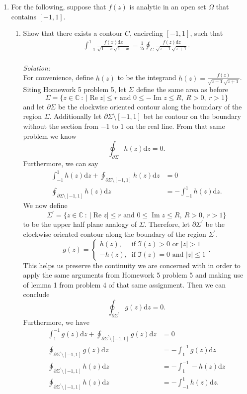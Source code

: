 \documentclass[10pt]{amsart}
\newcommand{\D}{\mathrm{d}}
\newcommand{\I}{\mathrm{i}}
\DeclareMathOperator{\real}{Re}
\DeclareMathOperator{\imag}{Im}
\theoremstyle{nonumberplain}
\begin{document}
\begin{enumerate}[label={\bf {\arabic*}:}]
\newpage

\item For the following, suppose that $f(z)$ is analytic in an open
  set $\Omega$ that contains $[-1,1]$.  
\begin{enumerate}
\item Show that there exists a contour $C$, encircling $[-1,1]$,
such that 
\begin{align*}
	\int_{-1}^1 \frac{f(x)\D x}{\sqrt{1 -x} \sqrt{1 + x}} =
	\frac{1}{2\I} \oint_C \frac{f(z)\D z}{\sqrt{z -1} \sqrt{z + 1}}.
\end{align*} \\

\noindent
\textit{Solution:} \\
For convenience, define $h(z)$ to be the integrand $h(z) = \frac{f(z)}{\sqrt{z -1} \sqrt{z + 1}}$.
Siting Homework 5 problem 5, let $\Sigma$ define the same area as before
$$\Sigma = \{z \in \mathbb C ~:~ |\real z | \leq r \text{ and } 0 \leq -\imag z \leq R, ~ R > 0, ~ r > 1\}$$
and let $\partial \Sigma$ be the clockwise oriented contour along the boundary of the region $\Sigma$.
Additionally let $\partial \Sigma \setminus [-1, 1]$ bet he contour on the boundary without the section from $-1$ to $1$ on the real line.
From that same problem we know 
$$
\oint_{\partial \Sigma} h(z) \D z = 0.
$$
Furthermore, we can say
\begin{align}
\int_{-1}^{1} h(z) \D z + \oint_{\partial \Sigma \setminus [-1, 1]} h(z) \D z &= 0 \nonumber \\
\oint_{\partial \Sigma \setminus [-1, 1]} h(z) \D z &= -\int_{-1}^{1} h(z) \D z.
\label{eq:lower_rectangle}
\end{align}
We now define
$$ \Sigma^\prime = \{z \in \mathbb C ~:~ |\real z | \leq r \text{ and } 0 \leq \imag z \leq R, ~ R > 0, ~ r > 1\} $$
to be the upper half plane analogy of $\Sigma$.
Therefore, let $\partial \Sigma^\prime$ be the clockwise oriented contour along the boundary of the region $\Sigma^\prime$.
$$
g(z) = \begin{cases}
h(z), \quad \text{ if } \Im(z) > 0 \text{ or } |z| > 1 \\
- h(z), \: \text{ if } \Im(z) = 0 \text{ and } |z| \leq 1
\end{cases}.
$$
This helps us preserve the continuity we are concerned with in order to apply the same arguments from Homework 5 problem 5 and making use of lemma 1 from problem 4 of that same assignment.
Then we can conclude
$$\oint_{\partial \Sigma^\prime} g(z) \D z =  0. $$
Furthermore, we have
\begin{align}
\int_{1}^{-1} g(z) \D z + \oint_{\partial \Sigma^\prime\setminus[-1,1]} g(z) \D z &= 0 \nonumber \\
	\oint_{\partial \Sigma^\prime\setminus[-1,1]} g(z) \D z &= - \int_{1}^{-1} g(z) \D z \nonumber \\
	\oint_{\partial \Sigma^\prime\setminus[-1,1]} h(z) \D z &= - \int_{1}^{-1} -h(z) \D z \nonumber \\
	\oint_{\partial \Sigma^\prime\setminus[-1,1]} h(z) \D z &= - \int_{-1}^{1} h(z) \D z.
\label{eq:upper_rectangle}
\end{align}


\end{enumerate}
\end{enumerate}
\end{document}
